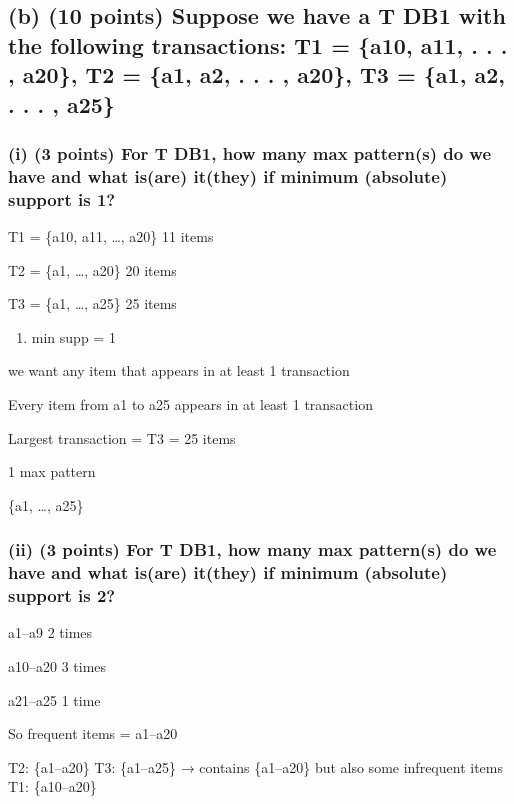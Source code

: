 \documentclass[
]{article}
\providecommand{\tightlist}{%
  \setlength{\itemsep}{0pt}\setlength{\parskip}{0pt}}
\begin{document}
\subsection{(b) (10 points) Suppose we have a T DB1 with the following
transactions: T1 = \{a10, a11, . . . , a20\}, T2 = \{a1, a2, . . . ,
a20\}, T3 = \{a1, a2, . . . ,
a25\}}\label{b-10-points-suppose-we-have-a-t-db1-with-the-following-transactions-t1-a10-a11-.-.-.-a20-t2-a1-a2-.-.-.-a20-t3-a1-a2-.-.-.-a25}

\subsubsection{(i) (3 points) For T DB1, how many max pattern(s) do we
have and what is(are) it(they) if minimum (absolute) support is
1?}\label{i-3-points-for-t-db1-how-many-max-patterns-do-we-have-and-what-isare-itthey-if-minimum-absolute-support-is-1}

T1 = \{a10, a11, \ldots, a20\} 11 items

T2 = \{a1, \ldots, a20\} 20 items

T3 = \{a1, \ldots, a25\} 25 items

\begin{enumerate}
\def\labelenumi{(\roman{enumi})}
\tightlist
\item
  min supp = 1
\end{enumerate}

we want any item that appears in at least 1 transaction

Every item from a1 to a25 appears in at least 1 transaction

Largest transaction = T3 = 25 items

1 max pattern

\{a1, \ldots, a25\}

\subsubsection{(ii) (3 points) For T DB1, how many max pattern(s) do we
have and what is(are) it(they) if minimum (absolute) support is
2?}\label{ii-3-points-for-t-db1-how-many-max-patterns-do-we-have-and-what-isare-itthey-if-minimum-absolute-support-is-2}

a1--a9 2 times

a10--a20 3 times

a21--a25 1 time

So frequent items = a1--a20

T2: \{a1--a20\} T3: \{a1--a25\} → contains \{a1--a20\} but also some
infrequent items T1: \{a10--a20\}
\end{document}
